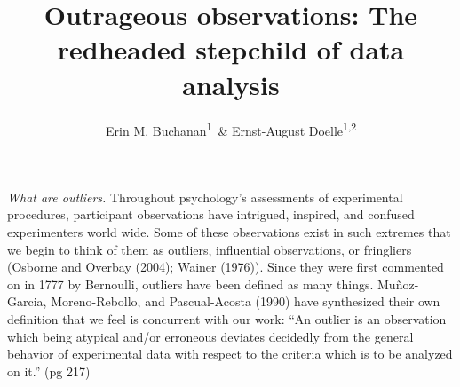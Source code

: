\documentclass[english,man]{apa6}
\title{Outrageous observations: The redheaded stepchild of data analysis}
\author{Erin M. Buchanan\textsuperscript{1}~\& Ernst-August Doelle\textsuperscript{1,2}}
\affiliation{
    \vspace{0.5cm}
          \textsuperscript{1} Wilhelm-Wundt-University\\
          \textsuperscript{2} Konstanz Business School  }
\theoremstyle{definition}
\theoremstyle{definition}
\theoremstyle{definition}
\theoremstyle{remark}
\begin{document}
\maketitle

\setcounter{secnumdepth}{0}



\emph{What are outliers.} Throughout psychology's assessments of
experimental procedures, participant observations have intrigued,
inspired, and confused experimenters world wide. Some of these
observations exist in such extremes that we begin to think of them as
outliers, influential observations, or fringliers (Osborne and Overbay
(2004); Wainer (1976)). Since they were first commented on in 1777 by
Bernoulli, outliers have been defined as many things. Muñoz-Garcia,
Moreno-Rebollo, and Pascual-Acosta (1990) have synthesized their own
definition that we feel is concurrent with our work: \enquote{An outlier
is an observation which being atypical and/or erroneous deviates
decidedly from the general behavior of experimental data with respect to
the criteria which is to be analyzed on it.} (pg 217)
\end{document}
